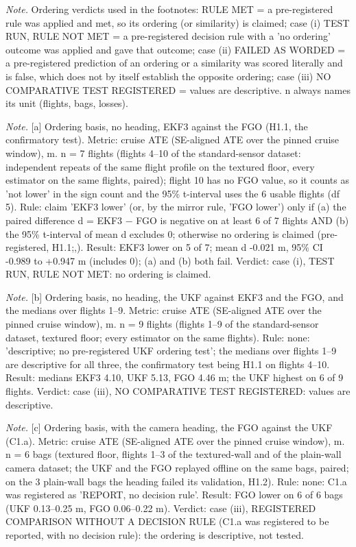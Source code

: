 \begin{table}[htbp]
\textit{Note.} Ordering verdicts used in the footnotes: RULE MET = a pre-registered rule was applied and met, so its ordering (or similarity) is claimed; case (i) TEST RUN, RULE NOT MET = a pre-registered decision rule with a 'no ordering' outcome was applied and gave that outcome; case (ii) FAILED AS WORDED = a pre-registered prediction of an ordering or a similarity was scored literally and is false, which does not by itself establish the opposite ordering; case (iii) NO COMPARATIVE TEST REGISTERED = values are descriptive. n always names its unit (flights, bags, losses).\par
\textit{Note.} [a] Ordering basis, no heading, EKF3 against the FGO (H1.1, the confirmatory test). Metric: cruise ATE (SE-aligned ATE over the pinned cruise window), m. n = 7 flights (flights 4--10 of the standard-sensor dataset: independent repeats of the same flight profile on the textured floor, every estimator on the same flights, paired); flight 10 has no FGO value, so it counts as 'not lower' in the sign count and the 95\% t-interval uses the 6 usable flights (df 5). Rule: claim 'EKF3 lower' (or, by the mirror rule, 'FGO lower') only if (a) the paired difference d = EKF3 $-$ FGO is negative on at least 6 of 7 flights AND (b) the 95\% t-interval of mean d excludes 0; otherwise no ordering is claimed (pre-registered, H1.1;,). Result: EKF3 lower on 5 of 7; mean d -0.021 m, 95\% CI -0.989 to +0.947 m (includes 0); (a) and (b) both fail. Verdict: case (i), TEST RUN, RULE NOT MET: no ordering is claimed.\par
\textit{Note.} [b] Ordering basis, no heading, the UKF against EKF3 and the FGO, and the medians over flights 1--9. Metric: cruise ATE (SE-aligned ATE over the pinned cruise window), m. n = 9 flights (flights 1--9 of the standard-sensor dataset, textured floor; every estimator on the same flights). Rule: none: 'descriptive; no pre-registered UKF ordering test'; the medians over flights 1--9 are descriptive for all three, the confirmatory test being H1.1 on flights 4--10. Result: medians EKF3 4.10, UKF 5.13, FGO 4.46 m; the UKF highest on 6 of 9 flights. Verdict: case (iii), NO COMPARATIVE TEST REGISTERED: values are descriptive.\par
\textit{Note.} [c] Ordering basis, with the camera heading, the FGO against the UKF (C1.a). Metric: cruise ATE (SE-aligned ATE over the pinned cruise window), m. n = 6 bags (textured floor, flights 1--3 of the textured-wall and of the plain-wall camera dataset; the UKF and the FGO replayed offline on the same bags, paired; on the 3 plain-wall bags the heading failed its validation, H1.2). Rule: none: C1.a was registered as 'REPORT, no decision rule'. Result: FGO lower on 6 of 6 bags (UKF 0.13--0.25 m, FGO 0.06--0.22 m). Verdict: case (iii), REGISTERED COMPARISON WITHOUT A DECISION RULE (C1.a was registered to be reported, with no decision rule): the ordering is descriptive, not tested.\par

\end{table}
